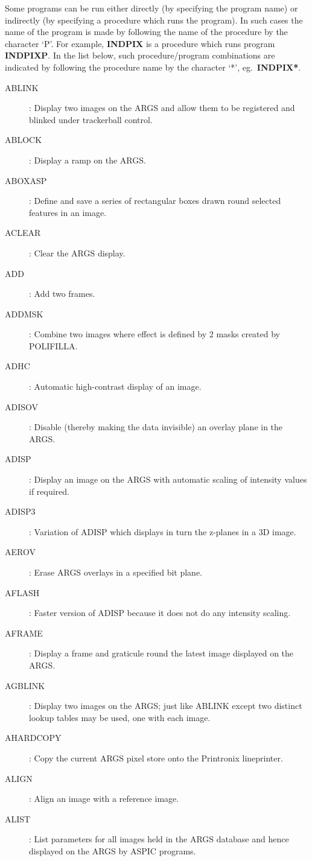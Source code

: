 Some programs can be run either directly (by specifying the program name) or
indirectly (by specifying a procedure which runs the program).
In such cases the name of the program is made by following the name of the
procedure by the character `P'.
For example, {\bf INDPIX} is a procedure which runs program {\bf INDPIXP}.
In the list below, such procedure/program combinations are indicated by
following the procedure name by the character `*', eg.\ {\bf INDPIX*}.
\begin{description}
\item [ABLINK]: Display two images on the ARGS and allow them to be registered
and blinked under trackerball control.
\item [ABLOCK]: Display a ramp on the ARGS.
\item [ABOXASP]: Define and save a series of rectangular boxes drawn round
selected features in an image.
\item [ACLEAR]: Clear the ARGS display.
\item [ADD]: Add two frames.
\item [ADDMSK]: Combine two images where effect is defined by 2 masks
created by POLIFILLA.
\item [ADHC]: Automatic high-contrast display of an image.
\item [ADISOV]: Disable (thereby making the data invisible) an overlay plane in
the ARGS.
\item [ADISP]: Display an image on the ARGS with automatic scaling of intensity
values if required.
\item [ADISP3]: Variation of ADISP which displays in turn the z-planes in a
3D image.
\item [AEROV]: Erase ARGS overlays in a specified bit plane.
\item [AFLASH]: Faster version of ADISP because it does not do any intensity
scaling.
\item [AFRAME]: Display a frame and graticule round the latest image displayed
on the ARGS.
\item [AGBLINK]: Display two images on the ARGS; just like ABLINK except two
distinct lookup tables may be used, one with each image.
\item [AHARDCOPY]: Copy the current ARGS pixel store onto the Printronix
lineprinter.
\item [ALIGN]: Align an image with a reference image.
\item [ALIST]: List parameters for all images held in the ARGS database and
hence displayed on the ARGS by ASPIC programs.

\end{description}
